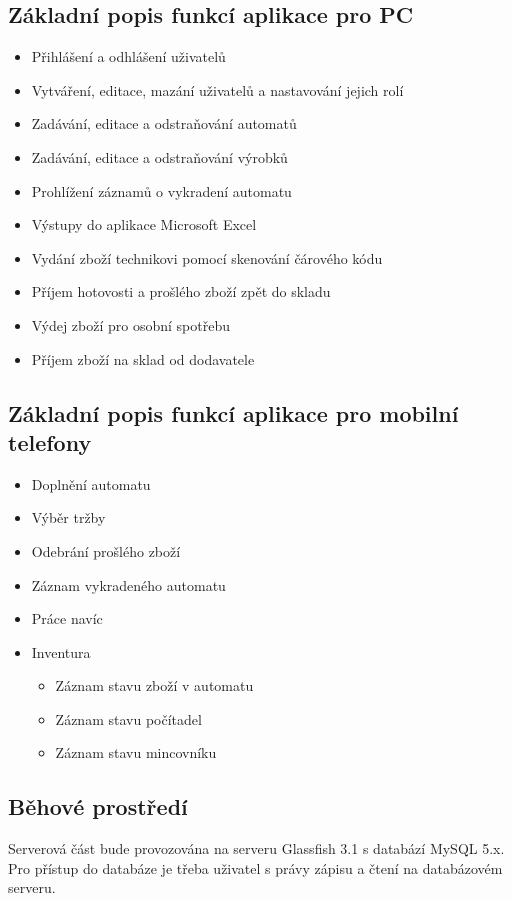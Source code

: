 \documentclass[a4paper,10pt]{article}
\begin{document}
\subsection{Základní popis funkcí aplikace pro PC}
\begin{itemize}
  \item Přihlášení a odhlášení uživatelů
  \item Vytváření, editace, mazání uživatelů a nastavování jejich rolí
  \item Zadávání, editace a odstraňování automatů
  \item Zadávání, editace a odstraňování výrobků
  \item Prohlížení záznamů o vykradení automatu
  \item Výstupy do aplikace Microsoft Excel
  \item Vydání zboží technikovi pomocí skenování čárového kódu
  \item Příjem hotovosti a prošlého zboží zpět do skladu
  \item Výdej zboží pro osobní spotřebu
  \item Příjem zboží na sklad od dodavatele
\end{itemize}

\subsection{Základní popis funkcí aplikace pro mobilní telefony}

\begin{itemize}
  \item Doplnění automatu
  \item Výběr tržby
  \item Odebrání prošlého zboží
  \item Záznam vykradeného automatu
  \item Práce navíc
  \item Inventura
  \begin{itemize}
  	\item Záznam stavu zboží v automatu
  	\item Záznam stavu počítadel
  	\item Záznam stavu mincovníku
  \end{itemize}
\end{itemize}

\subsection{Běhové prostředí}
Serverová část bude provozována na serveru Glassfish 3.1 s databází MySQL 5.x. Pro přístup do databáze je třeba uživatel s právy zápisu a čtení na databázovém serveru.
\end{document}
